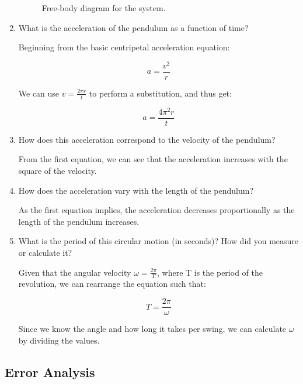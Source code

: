 \begin{enumerate}
\begin{figure}[h]
\caption{Free-body diagram for the system.}

\end{figure}

\item What is the acceleration of the pendulum as a function of time?

Beginning from the basic centripetal acceleration equation:

\begin{equation}a = \frac{v^2}{r}\end{equation}

We can use \begin{math}v = \frac{2 \pi r}{t}\end{math} to perform a substitution, and thus get:

\begin{equation}a = \frac{4 \pi^2 r}{t}\end{equation}

\item How does this acceleration correspond to the velocity of the pendulum?

From the first equation, we can see that the acceleration increases with the square of the velocity.

\item How does the acceleration vary with the length of the pendulum?

As the first equation implies, the acceleration decreases proportionally as the length of the pendulum increases.

\item What is the period of this circular motion (in seconds)?
How did you measure or calculate it?

Given that the angular velocity \begin{math}\omega = \frac{2\pi}{T}\end{math}, where T is the period of the revolution,
we can rearrange the equation such that:

\begin{equation}T = \frac{2\pi}{\omega}\end{equation}

Since we know the angle and how long it takes per swing, we can calculate \begin{math}\omega\end{math} by dividing the values.

\end{enumerate}

\subsection{Error Analysis}


